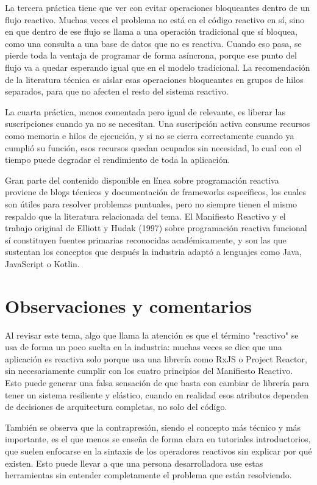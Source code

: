 \documentclass[12pt,letterpaper]{article}
\begin{document}
La tercera práctica tiene que ver con evitar operaciones bloqueantes dentro de un flujo reactivo. Muchas veces el problema no está en el código reactivo en sí, sino en que dentro de ese flujo se llama a una operación tradicional que sí bloquea, como una consulta a una base de datos que no es reactiva. Cuando eso pasa, se pierde toda la ventaja de programar de forma asíncrona, porque ese punto del flujo va a quedar esperando igual que en el modelo tradicional. La recomendación de la literatura técnica es aislar esas operaciones bloqueantes en grupos de hilos separados, para que no afecten el resto del sistema reactivo.

La cuarta práctica, menos comentada pero igual de relevante, es liberar las suscripciones cuando ya no se necesitan. Una suscripción activa consume recursos como memoria e hilos de ejecución, y si no se cierra correctamente cuando ya cumplió su función, esos recursos quedan ocupados sin necesidad, lo cual con el tiempo puede degradar el rendimiento de toda la aplicación.

Gran parte del contenido disponible en línea sobre programación reactiva proviene de blogs técnicos y documentación de frameworks específicos, los cuales son útiles para resolver problemas puntuales, pero no siempre tienen el mismo respaldo que la literatura relacionada del tema. El Manifiesto Reactivo y el trabajo original de Elliott y Hudak (1997) sobre programación reactiva funcional sí constituyen fuentes primarias reconocidas académicamente, y son las que sustentan los conceptos que después la industria adaptó a lenguajes como Java, JavaScript o Kotlin.

\section*{Observaciones y comentarios}

Al revisar este tema, algo que llama la atención es que el término "reactivo" se usa de forma un poco suelta en la industria: muchas veces se dice que una aplicación es reactiva solo porque usa una librería como RxJS o Project Reactor, sin necesariamente cumplir con los cuatro principios del Manifiesto Reactivo. Esto puede generar una falsa sensación de que basta con cambiar de librería para tener un sistema resiliente y elástico, cuando en realidad esos atributos dependen de decisiones de arquitectura completas, no solo del código.

También se observa que la contrapresión, siendo el concepto más técnico y más importante, es el que menos se enseña de forma clara en tutoriales introductorios, que suelen enfocarse en la sintaxis de los operadores reactivos sin explicar por qué existen. Esto puede llevar a que una persona desarrolladora use estas herramientas sin entender completamente el problema que están resolviendo.
\end{document}
